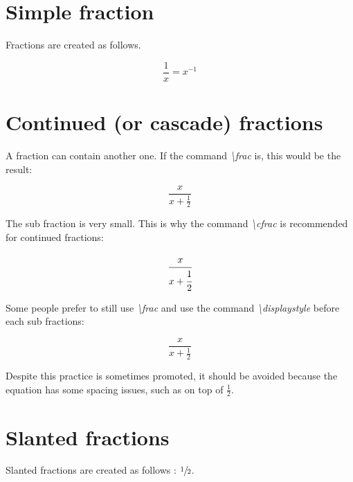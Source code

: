 \documentclass{article}
\begin{document}
\section*{Simple fraction}

Fractions are created as follows.


\[\frac{1}{x} = x^{-1}\]

\section*{Continued (or cascade) fractions}

A fraction can contain another one. If the command \emph{\textbackslash frac} is, this would be the result:

\[\frac{x}{x + \frac{1}{2}}\]

The sub fraction is very small. This is why the command \emph{\textbackslash cfrac} is recommended for continued fractions:

\[\cfrac{x}{x + \cfrac{1}{2}}\]

Some people prefer to still use \emph{\textbackslash frac} and use the command \emph{\textbackslash displaystyle} before each sub fractions:

\[\frac{x}{x + \displaystyle\frac{1}{2}}\]

Despite this practice is sometimes promoted, it should be avoided because the equation has some spacing issues, such as on top of $\frac{1}{2}$.

\section*{Slanted fractions}

Slanted fractions are created as follows : $\sfrac{1}{2}$.
\end{document}

